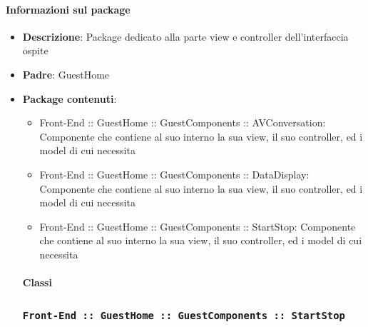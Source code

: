 \documentclass[../DefinizioneDiProdotto.tex]{subfiles}
\begin{document}
	\paragraph{Informazioni sul package}\begin{itemize}\item \textbf{Descrizione}: Package dedicato alla parte view e controller dell'interfaccia ospite\item \textbf{Padre}: GuestHome\item \textbf{Package contenuti}:
	\begin{itemize}\item Front-End :: GuestHome :: GuestComponents :: AVConversation: Componente che contiene al suo interno la sua view, il suo controller, ed i model di cui necessita
	\item Front-End :: GuestHome :: GuestComponents :: DataDisplay: Componente che contiene al suo interno la sua view, il suo controller, ed i model di cui necessita
	\item Front-End :: GuestHome :: GuestComponents :: StartStop: Componente che contiene al suo interno la sua view, il suo controller, ed i model di cui necessita
	\end{itemize}\paragraph{Classi}

	\newpage
	\subsubsection{\texttt{Front-End :: GuestHome :: GuestComponents :: StartStop}}


\end{itemize}
\end{document}
